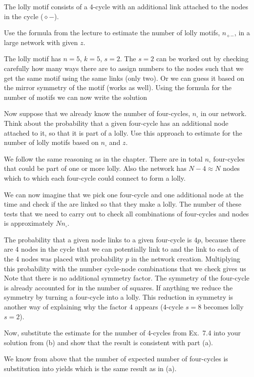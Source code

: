 The lolly motif consists of a 4-cycle with an additional link attached to the nodes in the cycle ($\diamond -$). 

\subquestion Use the formula from the lecture to estimate the number of lolly motifs, $n_{\diamond -}$, in a large network with given $z$. 

\solution
The lolly motif has $n=5$, $k=5$, $s=2$. The $s=2$ can be worked out by checking carefully how many ways there are to assign numbers to the nodes such that we get the same motif using the same links (only two). Or we can guess it based on the mirror symmetry of the motif (works as well). Using the formula for the number of motifs we can now write the solution

\subquestion Now suppose that we already know the number of four-cycles, $n_{\square}$ in our network. Think about the probability that a given four-cycle has an additional node attached to it, so that it is part of a lolly. Use this approach to estimate for the number of lolly motifs based on $n_{\square}$ and $z$. 

\solution We follow the same reasoning as in the chapter. There are in total $n_\square$ four-cycles that could be part of one or more lolly. Also the network has $N-4\approx N$ nodes which to which each four-cycle could connect to form a lolly. 

We can now imagine that we pick one four-cycle and one additional node at the time and check if the are linked so that they make a lolly. The number of these tests that we need to carry out to check all combinations of four-cycles and nodes is approximately $Nn_{\square}$. 

The probability that a given node links to a given four-cycle is $4p$, because there are 4 nodes in the cycle that we can potentially link to and the link to each of the 4 nodes was placed with probability $p$ in the network creation. 
Multiplying this probability with the number cycle-node combinations that we check gives us
Note that there is no additional symmetry factor. The symmetry of the four-cycle is already accounted for in the number of squares. If anything we reduce the symmetry by turning a four-cycle into a lolly. This reduction in symmetry is another way of explaining why the factor 4 appears (4-cycle $s=8$ becomes lolly $s=2$). 

\subquestion Now, substitute the estimate for the number of 4-cycles from  Ex.~7.4 into your solution from (b) and show that the result is consistent with part (a).  

\solution 
We know from above that the number of expected number of four-cycles is 
substitution into 
yields
which is the same result as in (a).

\solutionend

